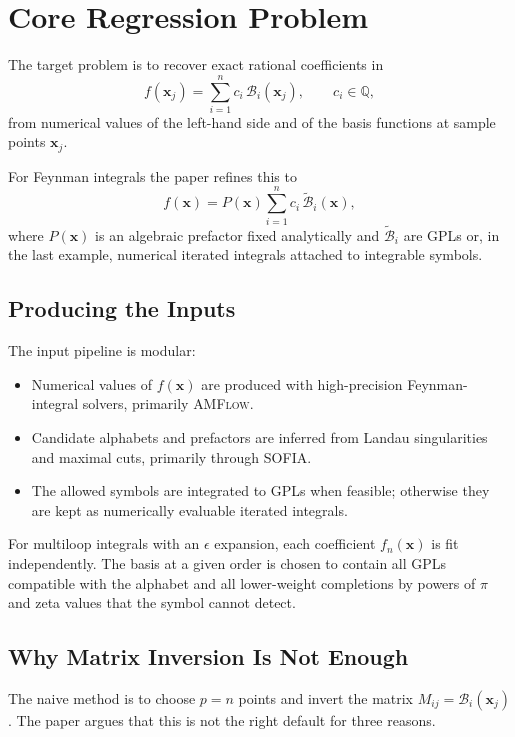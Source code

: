 \documentclass[11pt]{article}
\newcommand{\cB}{\mathcal{B}}
\newcommand{\bx}{\mathbf{x}}
\begin{document}
\section{Core Regression Problem}
The target problem is to recover exact rational coefficients in
\begin{equation}
f(\bx_j)=\sum_{i=1}^{n} c_i\,\cB_i(\bx_j), \qquad c_i\in\mathbb{Q},
\label{eq:core-problem}
\end{equation}
from numerical values of the left-hand side and of the basis functions at sample points $\bx_j$.

For Feynman integrals the paper refines this to
\begin{equation}
f(\bx)=P(\bx)\sum_{i=1}^{n} c_i\,\widetilde{\cB}_i(\bx),
\label{eq:prefactor-form}
\end{equation}
where $P(\bx)$ is an algebraic prefactor fixed analytically and $\widetilde{\cB}_i$ are GPLs or, in the last example, numerical iterated integrals attached to integrable symbols.

\subsection{Producing the Inputs}
The input pipeline is modular:
\begin{itemize}
    \item Numerical values of $f(\bx)$ are produced with high-precision Feynman-integral solvers, primarily \textsc{AMFlow}.
    \item Candidate alphabets and prefactors are inferred from Landau singularities and maximal cuts, primarily through \textsc{SOFIA}.
    \item The allowed symbols are integrated to GPLs when feasible; otherwise they are kept as numerically evaluable iterated integrals.
\end{itemize}

For multiloop integrals with an $\epsilon$ expansion, each coefficient $f_n(\bx)$ is fit independently. The basis at a given order is chosen to contain all GPLs compatible with the alphabet and all lower-weight completions by powers of $\pi$ and zeta values that the symbol cannot detect.

\subsection{Why Matrix Inversion Is Not Enough}
The naive method is to choose $p=n$ points and invert the matrix $M_{ij}=\cB_i(\bx_j)$. The paper argues that this is not the right default for three reasons.
\end{document}
